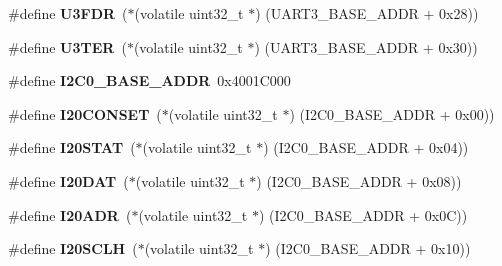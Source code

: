 \begin{DoxyCompactItemize}
\item 
\mbox{\label{group__lpc24xx__regs_gaf6ba17d223a4a63bbfd90f484ae07ca1}} 
\#define {\bfseries U3\+F\+DR}~($\ast$(volatile uint32\+\_\+t $\ast$) (U\+A\+R\+T3\+\_\+\+B\+A\+S\+E\+\_\+\+A\+D\+DR + 0x28))
\item 
\mbox{\label{group__lpc24xx__regs_ga47d631a5b4579f94d442f6d59620bd0b}} 
\#define {\bfseries U3\+T\+ER}~($\ast$(volatile uint32\+\_\+t $\ast$) (U\+A\+R\+T3\+\_\+\+B\+A\+S\+E\+\_\+\+A\+D\+DR + 0x30))
\item 
\mbox{\label{group__lpc24xx__regs_gaf92536fd2e82cc12a5193ade75b4f23c}} 
\#define {\bfseries I2\+C0\+\_\+\+B\+A\+S\+E\+\_\+\+A\+D\+DR}~0x4001\+C000
\item 
\mbox{\label{group__lpc24xx__regs_gad263e73ddc458addf152dda00ddb3185}} 
\#define {\bfseries I20\+C\+O\+N\+S\+ET}~($\ast$(volatile uint32\+\_\+t $\ast$) (I2\+C0\+\_\+\+B\+A\+S\+E\+\_\+\+A\+D\+DR + 0x00))
\item 
\mbox{\label{group__lpc24xx__regs_ga00a995ae21d5d65b8bb630570a3be7c7}} 
\#define {\bfseries I20\+S\+T\+AT}~($\ast$(volatile uint32\+\_\+t $\ast$) (I2\+C0\+\_\+\+B\+A\+S\+E\+\_\+\+A\+D\+DR + 0x04))
\item 
\mbox{\label{group__lpc24xx__regs_ga1f4c7c137f5f855a4a9f539c59f839a1}} 
\#define {\bfseries I20\+D\+AT}~($\ast$(volatile uint32\+\_\+t $\ast$) (I2\+C0\+\_\+\+B\+A\+S\+E\+\_\+\+A\+D\+DR + 0x08))
\item 
\mbox{\label{group__lpc24xx__regs_gad5232ba68adf5387493064170c646871}} 
\#define {\bfseries I20\+A\+DR}~($\ast$(volatile uint32\+\_\+t $\ast$) (I2\+C0\+\_\+\+B\+A\+S\+E\+\_\+\+A\+D\+DR + 0x0\+C))
\item 
\mbox{\label{group__lpc24xx__regs_gae20dac34511f86fb2255f6f2cdefb608}} 
\#define {\bfseries I20\+S\+C\+LH}~($\ast$(volatile uint32\+\_\+t $\ast$) (I2\+C0\+\_\+\+B\+A\+S\+E\+\_\+\+A\+D\+DR + 0x10))
\item 
\mbox{\label{group__lpc24xx__regs_gabc17e67260e18929e24416a46b0b1d04}} 

\end{DoxyCompactItemize}
